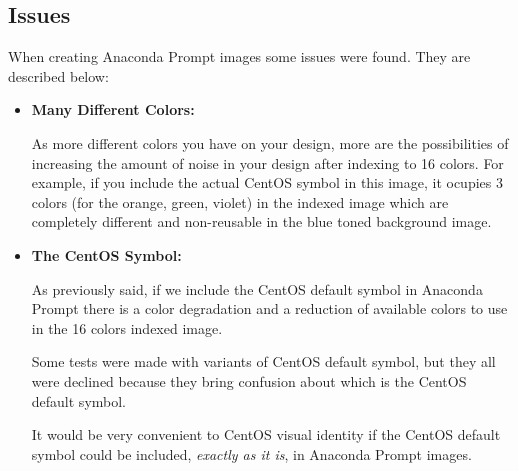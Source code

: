 \subsection{Issues}
\hypertarget{sec:Distribution:Anaconda:Prompt:Issues}{}
\label{sec:Distribution:Anaconda:Prompt:Issues}

When creating Anaconda Prompt images some issues were found. They are
described below:

\begin{itemize}

\item \textbf{Many Different Colors:}

As more different colors you have on your design, more are the
possibilities of increasing the amount of noise in your design after
indexing to 16 colors. For example, if you include the actual CentOS
symbol in this image, it ocupies 3 colors (for the orange, green,
violet) in the indexed image which are completely different and
non-reusable in the blue toned background image.

\item \textbf{The CentOS Symbol:}

As previously said, if we include the CentOS default symbol in
Anaconda Prompt there is a color degradation and a reduction of
available colors to use in the 16 colors indexed image.

Some tests were made with variants of CentOS default symbol, but they
all were declined because they bring confusion about which is the
CentOS default symbol.

It would be very convenient to CentOS visual identity if the CentOS
default symbol could be included, \textit{exactly as it is}, in
Anaconda Prompt images.

\end{itemize}

